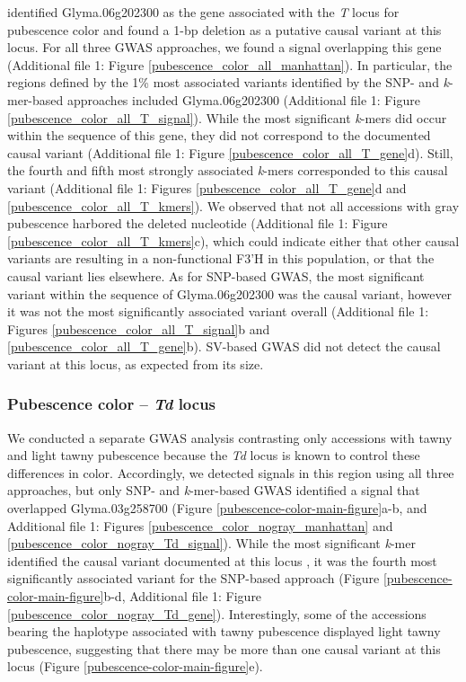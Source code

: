 \cite{zabala2003} identified Glyma.06g202300 as the gene associated with the
\textit{T} locus for pubescence color and found a 1-bp deletion as a putative
causal variant at this locus. For all three GWAS approaches, we found a signal
overlapping this gene (Additional file 1: Figure \ref{pubescence_color_all_manhattan}). In
particular, the regions defined by the 1\% most associated variants
identified by the SNP- and \textit{k}-mer-based approaches included
Glyma.06g202300 (Additional file 1: Figure \ref{pubescence_color_all_T_signal}). While the most
significant \textit{k}-mers did occur within the sequence of this gene, they
did not correspond to the documented causal variant (Additional file 1: Figure
\ref{pubescence_color_all_T_gene}d).  Still, the fourth and fifth most strongly
associated \textit{k}-mers corresponded to this causal variant (Additional file 1: Figures
\ref{pubescence_color_all_T_gene}d and \ref{pubescence_color_all_T_kmers}). We
observed that not all accessions with gray pubescence harbored the deleted
nucleotide (Additional file 1: Figure \ref{pubescence_color_all_T_kmers}c), which could indicate
either that other causal variants are resulting in a non-functional F3’H in
this population, or that the causal variant lies elsewhere. As for SNP-based GWAS,
the most significant variant within the sequence of Glyma.06g202300 was the
causal variant, however it was not the most significantly associated variant
overall (Additional file 1: Figures \ref{pubescence_color_all_T_signal}b and
\ref{pubescence_color_all_T_gene}b). SV-based GWAS did not detect the causal variant
at this locus, as expected from its size.

\subsubsection*{Pubescence color -- \textit{Td} locus}
\label{sv-gwas-main-results-pubescence-color-td}

We conducted a separate GWAS analysis contrasting only accessions with tawny
and light tawny pubescence because the \textit{Td} locus is known to control
these differences in color. Accordingly, we detected signals in this region
using all three approaches, but only SNP- and \textit{k}-mer-based GWAS
identified a signal that overlapped Glyma.03g258700 (Figure
\ref{pubescence-color-main-figure}a-b, and Additional file 1: Figures \ref{pubescence_color_nogray_manhattan} and
\ref{pubescence_color_nogray_Td_signal}).  While the most significant
\textit{k}-mer identified the causal variant documented at this locus
\citep{yan2020}, it was the fourth most significantly associated variant for
the SNP-based approach (Figure \ref{pubescence-color-main-figure}b-d, Additional file 1: Figure 
\ref{pubescence_color_nogray_Td_gene}).  Interestingly, some of the accessions
bearing the haplotype associated with tawny pubescence displayed light tawny
pubescence, suggesting that there may be more than one causal variant at this
locus (Figure \ref{pubescence-color-main-figure}e).

